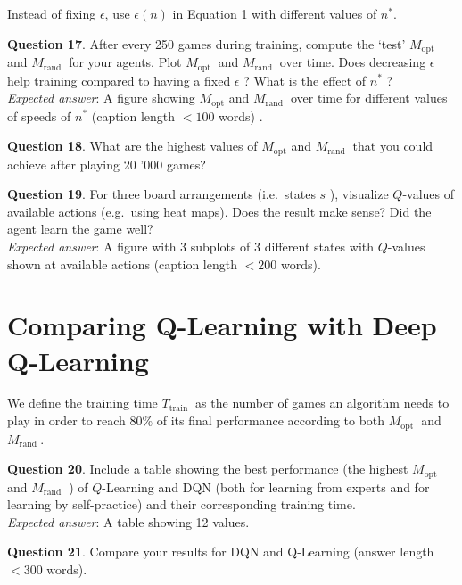 \documentclass[11pt]{article}
\makeatletter
\newcommand{\boxspacing}{\kern\kvtcb@left@rule\kern\kvtcb@boxsep}
\newcommand{\prompt}[4]{
        {\ttfamily\llap{{\color{#2}[#3]:\hspace{3pt}#4}}\vspace{-\baselineskip}}
    }
\makeatother
\begin{document}
Instead of fixing \(\epsilon\), use \(\epsilon(n)\) in Equation 1 with
different values of \(n^{*}\).

\textbf{Question 17}. After every 250 games during training, compute the
`test' \(M_{\text {opt }}\) and \(M_{\text {rand }}\) for your agents.
Plot \(M_{\text {opt }}\) and \(M_{\text {rand }}\) over time. Does
decreasing \(\epsilon\) help training compared to having a fixed
\(\epsilon\) ? What is the effect of \(n^{*}\) ?\\
\emph{Expected answer}: A figure showing \(M_{\mathrm{opt}}\) and
\(M_{\text {rand }}\) over time for different values of speeds of
\(n^{*}\) (caption length \(<100\) words) .

\textbf{Question 18}. What are the highest values of
\(M_{\mathrm{opt}}\) and \(M_{\text {rand }}\) that you could achieve
after playing 20 '000 games?

\textbf{Question 19}. For three board arrangements (i.e.~states \(s\) ),
visualize \(Q\)-values of available actions (e.g.~using heat maps). Does
the result make sense? Did the agent learn the game well?\\
\emph{Expected answer}: A figure with 3 subplots of 3 different states
with \(Q\)-values shown at available actions (caption length \(<200\)
words).

    \hypertarget{comparing-q-learning-with-deep-q-learning}{%
\section{Comparing Q-Learning with Deep
Q-Learning}\label{comparing-q-learning-with-deep-q-learning}}

    We define the training time \(T_{\text {train }}\) as the number of
games an algorithm needs to play in order to reach \(80 \%\) of its
final performance according to both \(M_{\text {opt }}\) and
\(M_{\text {rand }}\).

\textbf{Question 20}. Include a table showing the best performance (the
highest \(M_{\text {opt }}\) and \(M_{\text {rand }}\) ) of
\(Q\)-Learning and DQN (both for learning from experts and for learning
by self-practice) and their corresponding training time.\\
\emph{Expected answer}: A table showing 12 values.

\textbf{Question 21}. Compare your results for DQN and Q-Learning
(answer length \(<300\) words).

    \begin{tcolorbox}[breakable, size=fbox, boxrule=1pt, pad at break*=1mm,colback=cellbackground, colframe=cellborder]
\prompt{In}{incolor}{ }{\boxspacing}
\begin{Verbatim}[commandchars=\\\{\}]

\end{Verbatim}
\end{tcolorbox}


    
    
    
\end{document}
